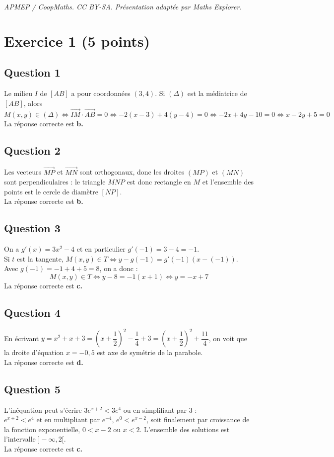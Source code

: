 \documentclass[10pt]{article}
\begin{document}
\noindent\textit{APMEP / CoopMaths. CC BY-SA. Présentation adaptée par Maths Explorer.}\par\medskip
\section*{Exercice 1 (5 points)}
	
	\subsection*{Question 1}
	Le milieu $I$ de $[AB]$ a pour coordonnées $(3, 4)$. Si $(\Delta)$ est la médiatrice de $[AB]$, alors
	\[
	M(x, y) \in (\Delta) \iff \overrightarrow{IM} \cdot \overrightarrow{AB} = 0 \iff -2(x - 3) + 4(y - 4) = 0 \iff -2x + 4y - 10 = 0 \iff x - 2y + 5 = 0
	\]
	La réponse correcte est \textbf{b.}
	
	\subsection*{Question 2}
	Les vecteurs $\overrightarrow{MP}$ et $\overrightarrow{MN}$ sont orthogonaux, donc les droites $(MP)$ et $(MN)$ sont perpendiculaires : le triangle $MNP$ est donc rectangle en $M$ et l’ensemble des points est le cercle de diamètre $[NP]$.\\ La réponse correcte est \textbf{b.}
	
	\subsection*{Question 3}
	On a $g'(x) = 3x^2 - 4$ et en particulier $g'(-1) = 3 - 4 = -1$.\\ Si $t$ est la tangente, $M(x, y) \in T \iff y - g(-1) = g'(-1)(x - (-1))$.\\ Avec $g(-1) = -1 + 4 + 5 = 8$, on a donc :
	\[
	M(x, y) \in T \iff y - 8 = -1(x + 1) \iff y = -x + 7
	\]
	La réponse correcte est \textbf{c.}
	
	\subsection*{Question 4}
	En écrivant $y = x^2 + x + 3 = \left( x + \dfrac{1}{2} \right)^2 - \dfrac{1}{4} + 3 = \left( x + \dfrac{1}{2} \right)^2 + \dfrac{11}{4}$, on voit que la droite d’équation $x = -0,5$ est axe de symétrie de la parabole.\\
	 La réponse correcte est \textbf{d.}
	
	\subsection*{Question 5}
	L’inéquation peut s’écrire $3e^{x+2} < 3e^4$ ou en simplifiant par 3 :\\ $e^{x+2} < e^4$ et en multipliant par $e^{-4}$, $e^{0} < e^{x-2}$, soit finalement par croissance de la fonction exponentielle, $0 < x - 2$ ou $x < 2$. L’ensemble des solutions est l’intervalle $] -\infty, 2[$.\\
	 La réponse correcte est \textbf{c.}
\end{document}
